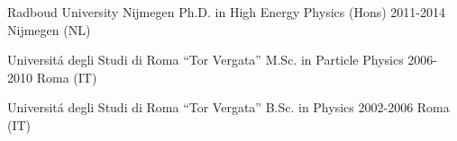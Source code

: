 

\begin{cveducations}

\cveducation
{Radboud University Nijmegen} %
{Ph.D. in High Energy Physics (Hons)} %
{2011-2014} %
{Nijmegen (NL)} %
\skipV

\cveducation
{Universit\'a degli Studi di Roma ``Tor Vergata''} %
{M.Sc. in Particle Physics} %
{2006-2010} %
{Roma (IT)} %
\skipV

\cveducation
{Universit\'a degli Studi di Roma ``Tor Vergata''} %
{B.Sc. in Physics} %
{2002-2006} %
{Roma (IT)} %
\skipV

\end{cveducations}
